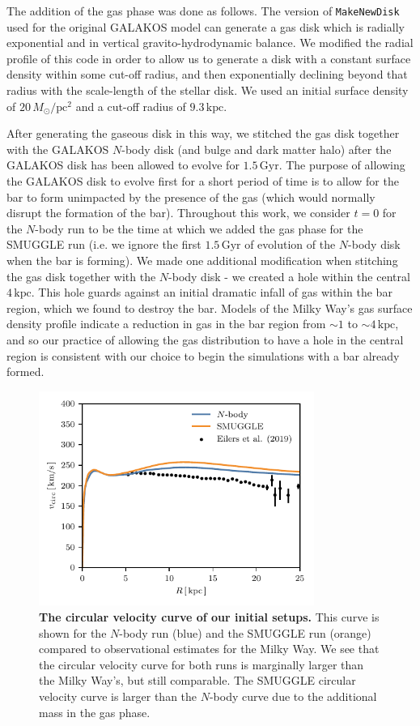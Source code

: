 \documentclass{natureprintstyle}
\newcommand{\Nbody}{$N$-body}
\begin{document}
The addition of the gas phase was done as follows. The version of
\texttt{MakeNewDisk} used for the original GALAKOS model can generate a gas
disk which is radially exponential and in vertical gravito-hydrodynamic
balance. We modified the radial profile of this code in order to allow us to
generate a disk with a constant surface density within some cut-off radius,
and then exponentially declining beyond that radius with the scale-length of
the stellar disk. We used an initial surface density of
$20\,M_{\odot}/\textrm{pc}^2$ and a cut-off radius of $9.3\,\textrm{kpc}$.

After generating the gaseous disk in this way, we stitched the gas disk
together with the GALAKOS \Nbody{} disk (and bulge and dark matter halo) after
the GALAKOS disk has been allowed to evolve for $1.5\,\textrm{Gyr}$. The
purpose of allowing the GALAKOS disk to evolve first for a short period of
time is to allow for the bar to form unimpacted by the presence of the gas
(which would normally disrupt the formation of the bar). Throughout this work,
we consider $t=0$ for the \Nbody{} run to be the time at which we added the
gas phase for the SMUGGLE run (i.e. we ignore the first $1.5\,\textrm{Gyr}$ of
evolution of the \Nbody{} disk when the bar is forming). We made one
additional modification when stitching the gas disk together with the \Nbody{}
disk - we created a hole within the central $4\,\textrm{kpc}$. This hole
guards against an initial dramatic infall of gas within the bar region, which
we found to destroy the bar. Models of the Milky Way's gas surface density
profile indicate a reduction in gas in the bar region from $\sim1$ to
$\sim4\,\textrm{kpc}$,\cite{2022ApJ...929L..18E} and so our practice of
allowing the gas distribution to have a hole in the central region is
consistent with our choice to begin the simulations with a bar already formed.

\begin{figure}[t]%
\centering
\includegraphics[width=9cm]{fig/fig-vcirc.pdf}
\caption{\textbf{The circular velocity curve of our initial setups.} This
curve is shown for the \Nbody{} run (blue) and the SMUGGLE run (orange)
compared to observational estimates for the Milky
Way.\cite{2019ApJ...871..120E} We see that the circular velocity curve for
both runs is marginally larger than the Milky Way's, but still comparable. The
SMUGGLE circular velocity curve is larger than the \Nbody{} curve due to the
additional mass in the gas phase.}
\label{fig:vcirc}
\end{figure}
\end{document}
